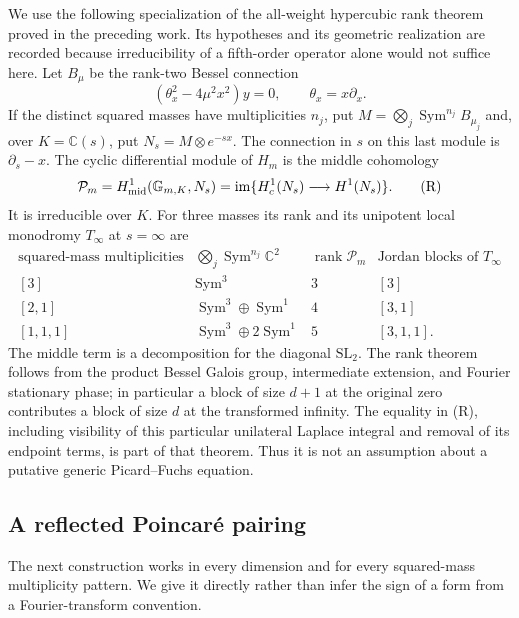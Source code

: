 \documentclass[11pt,a4paper]{article}
\theoremstyle{definition}
\theoremstyle{remark}
\numberwithin{equation}{section}
\begin{document}
We use the following specialization of the all-weight hypercubic
rank theorem proved in the preceding work. Its hypotheses and its
geometric realization are recorded because irreducibility of a
fifth-order operator alone would not suffice here.
Let $B_\mu$ be the rank-two Bessel connection
\[
 (\theta_x^2-4\mu^2x^2)y=0,\qquad\theta_x=x\partial_x.
\]
If the distinct squared masses have multiplicities $n_j$, put
$M=\bigotimes_j\operatorname{Sym}^{n_j}B_{\mu_j}$ and, over
$K=\mathbb C(s)$, put $N_s=M\otimes e^{-sx}$. The connection in $s$
on this last module is $\partial_s-x$. The cyclic differential
module of $H_m$ is the middle cohomology
\[
 \mathcal P_m=H^1_{\rm mid}(\mathbb G_{m,K},N_s)
 =\operatorname{im}\{H^1_c(N_s)\longrightarrow H^1(N_s)\}.
 \tag{R}
\]
It is irreducible over $K$. For three masses its rank and its
unipotent local monodromy $T_\infty$ at $s=\infty$ are
\[
\begin{array}{c|c|c|c}
\text{squared-mass multiplicities}&
 \bigotimes_j\operatorname{Sym}^{n_j}\mathbb C^2
 &\operatorname{rank}\mathcal P_m&\text{Jordan blocks of }T_\infty\\ \hline
{[3]}&\operatorname{Sym}^3&3&[3]\\
{[2,1]}&\operatorname{Sym}^3\oplus\operatorname{Sym}^1&4&[3,1]\\
{[1,1,1]}&\operatorname{Sym}^3\oplus2\operatorname{Sym}^1&5&[3,1,1].
\end{array}
\tag{R3}
\]
The middle term is a decomposition for the diagonal $\mathrm{SL}_2$.
The rank theorem follows from the product Bessel Galois group,
intermediate extension, and Fourier stationary phase; in particular
a block of size $d+1$ at the original zero contributes a block of
size $d$ at the transformed infinity. The equality in (R), including
visibility of this particular unilateral Laplace integral and removal
of its endpoint terms, is part of that theorem. Thus it is not an
assumption about a putative generic Picard--Fuchs equation.

\subsection{A reflected Poincar\'e pairing}

The next construction works in every dimension and for every
squared-mass multiplicity pattern. We give it directly rather than
infer the sign of a form from a Fourier-transform convention.
\end{document}
